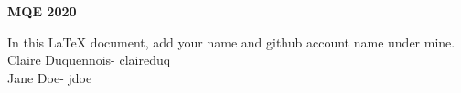 \documentclass[a4paper, 10pt]{article}
\begin{document}
\begin{center}\bfseries\Huge MQE 2020 \end{center}

\vspace{10mm} %
In this LaTeX document, add your name and github account name under mine.\\

\vspace{10mm} %
\noindent Claire Duquennois- claireduq\\
Jane Doe- jdoe\\
\end{document}
